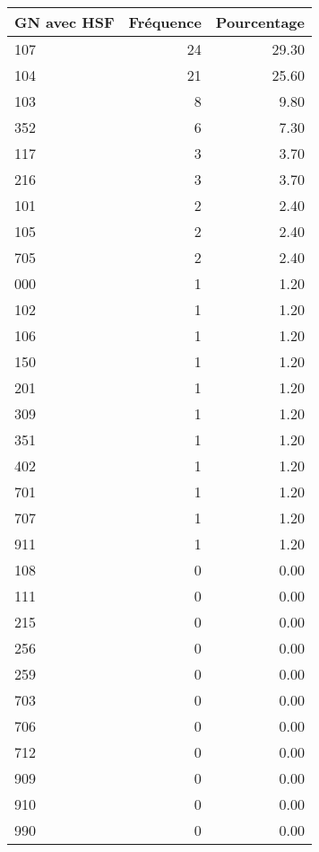 \documentclass[11pt,a4paper]{article}\usepackage[]{graphicx}\usepackage[]{color}
\begin{document}
\begin{table}[H]
\centering
\begin{tabular}{lrr}
  \hline
GN avec HSF & Fréquence & Pourcentage \\ 
  \hline
107 &  24 & 29.30 \\ 
  104 &  21 & 25.60 \\ 
  103 &   8 & 9.80 \\ 
  352 &   6 & 7.30 \\ 
  117 &   3 & 3.70 \\ 
  216 &   3 & 3.70 \\ 
  101 &   2 & 2.40 \\ 
  105 &   2 & 2.40 \\ 
  705 &   2 & 2.40 \\ 
  000 &   1 & 1.20 \\ 
  102 &   1 & 1.20 \\ 
  106 &   1 & 1.20 \\ 
  150 &   1 & 1.20 \\ 
  201 &   1 & 1.20 \\ 
  309 &   1 & 1.20 \\ 
  351 &   1 & 1.20 \\ 
  402 &   1 & 1.20 \\ 
  701 &   1 & 1.20 \\ 
  707 &   1 & 1.20 \\ 
  911 &   1 & 1.20 \\ 
  108 &   0 & 0.00 \\ 
  111 &   0 & 0.00 \\ 
  215 &   0 & 0.00 \\ 
  256 &   0 & 0.00 \\ 
  259 &   0 & 0.00 \\ 
  703 &   0 & 0.00 \\ 
  706 &   0 & 0.00 \\ 
  712 &   0 & 0.00 \\ 
  909 &   0 & 0.00 \\ 
  910 &   0 & 0.00 \\ 
  990 &   0 & 0.00 \\ 
   \hline
\end{tabular}
\end{table}
\end{document}
